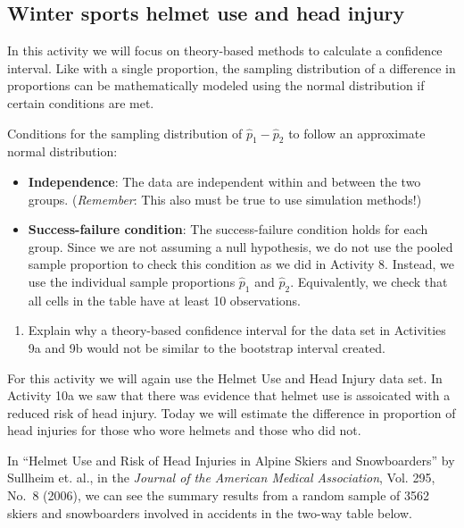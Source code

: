 \documentclass[
]{report}
\providecommand{\tightlist}{%
  \setlength{\itemsep}{0pt}\setlength{\parskip}{0pt}}
\begin{document}
\hypertarget{winter-sports-helmet-use-and-head-injury}{%
\subsection{Winter sports helmet use and head injury}\label{winter-sports-helmet-use-and-head-injury}}

In this activity we will focus on theory-based methods to calculate a confidence interval. Like with a single proportion, the sampling distribution of a difference in proportions can be mathematically modeled using the normal distribution if certain conditions are met.

Conditions for the sampling distribution of \(\hat{p}_1-\hat{p}_2\) to follow an approximate normal distribution:

\begin{itemize}
\item
  \textbf{Independence}: The data are independent within and between the two groups. (\emph{Remember}: This also must be true to use simulation methods!)
\item
  \textbf{Success-failure condition}: The success-failure condition holds for each group. Since we are not assuming a null hypothesis, we do not use the pooled sample proportion to check this condition as we did in Activity 8. Instead, we use the individual sample proportions \(\hat{p}_1\) and \(\hat{p}_2\). Equivalently, we check that all cells in the table have at least 10 observations.
\end{itemize}

\begin{enumerate}
\def\labelenumi{\arabic{enumi}.}
\tightlist
\item
  Explain why a theory-based confidence interval for the data set in Activities 9a and 9b would not be similar to the bootstrap interval created.
\end{enumerate}

\vspace{1in}

For this activity we will again use the Helmet Use and Head Injury data set. In Activity 10a we saw that there was evidence that helmet use is assoicated with a reduced risk of head injury. Today we will estimate the difference in proportion of head injuries for those who wore helmets and those who did not.

In ``Helmet Use and Risk of Head Injuries in Alpine Skiers and Snowboarders'' by Sullheim et. al., in the \emph{Journal of the American Medical Association}, Vol. 295, No.~8 (2006), we can see the summary results from a random sample of 3562 skiers and snowboarders involved in accidents in the two-way table below.
\end{document}
